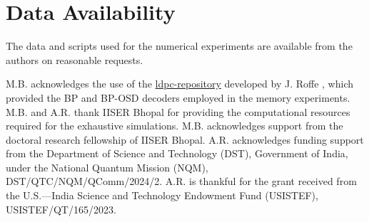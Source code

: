 \documentclass[%
 reprint,
 amsmath,amssymb,
 aps,
pra,
showkeys,
]{revtex4-2}
\begin{document}
\section*{Data Availability}
The data and scripts used for the numerical experiments are available from the authors on reasonable requests.

\begin{acknowledgments}
M.B. acknowledges the use of the \href{https://github.com/quantumgizmos/ldpc_v2}{ldpc-repository} developed by J. Roffe \cite{Roffe_LDPC_Python_tools_2022}, which provided the BP and BP-OSD decoders \cite{roffe_decoding_2020} employed in the memory experiments. 
M.B. and A.R. thank IISER Bhopal for providing the computational resources required for the exhaustive simulations. 
M.B. acknowledges support from the doctoral research fellowship of IISER Bhopal.
A.R. acknowledges funding support from the Department of Science and Technology (DST), Government of India, under the National Quantum Mission (NQM), DST/QTC/NQM/QComm/2024/2.
A.R. is thankful for the grant received from the U.S.—India Science and Technology Endowment Fund (USISTEF), USISTEF/QT/165/2023. 
\end{acknowledgments}


\appendix
\end{document}
